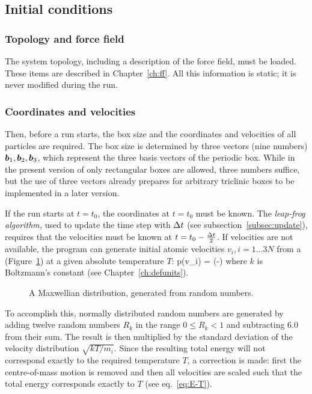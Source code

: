 \subsection{Initial conditions}
\subsubsection*{Topology and force field}
The system topology, including a description of the force field, must
be loaded. These items are described in Chapter~\ref{ch:ff}.
All this information is static; it is never modified during the run.

\subsubsection*{Coordinates and velocities}
Then, before a run starts, the box size and the coordinates and
velocities of  all particles are required. The box size is determined
by three vectors (nine numbers) $\mbox{\boldmath ${b}$}_1, \mbox{\boldmath ${b}$}_2, \mbox{\boldmath ${b}$}_3$, which
represent the three basis vectors of the periodic box. While in the
present version of \gromacs only rectangular boxes are allowed, three
numbers  suffice, but the use of three vectors already
prepares for arbitrary triclinic boxes to be implemented in a later
version. 

If the run starts at $t=t_0$, the  coordinates
at $t=t_0$ must be known. The {\em leap-frog algorithm,} used to
update the time step with ${\Delta t}$ (see subsection~\ref{subsec:update}), requires
that the velocities must be known at $t=t_0 - {\frac {\Delta t}{2}}$. If
velocities are not available, the program can generate initial atomic
velocities $v_i, i=1\ldots 3N$ from a 
(Figure~\ref{fig:maxwell}) at a
given absolute temperature $T$:
\beq 
p(v_i) = \exp(-)
\eeq
where $k$ is Boltzmann's constant (see Chapter~\ref{ch:defunits}).
\begin{figure}
\centerline{}
\caption{A Maxwellian distribution, generated from random numbers.}
\label{fig:maxwell}
\end{figure}
To accomplish this, normally distributed random numbers are generated
by adding twelve random numbers $R_k$ in the range $0 \le R_k < 1$ and
subtracting 6.0 from their sum. The result is then multiplied by the
standard deviation of the velocity distribution $\sqrt{kT/m_i}$. Since
the resulting total energy will not correspond exactly  to the
required temperature $T$, a correction is made: first the
centre-of-mass motion is removed and then all velocities are scaled
such that the total energy corresponds exactly to $T$ (see
eq.~\ref{eq:E-T}). 

